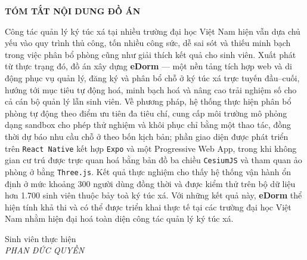 \documentclass[../DoAn.tex]{subfiles}
\begin{document}
\begin{center}
    {\bfseries\fontsize{18pt}{22pt}\selectfont TÓM TẮT NỘI DUNG ĐỒ ÁN}
\end{center}
\vspace{1.5cm}

Công tác quản lý ký túc xá tại nhiều trường đại học Việt Nam hiện vẫn dựa chủ
yếu vào quy trình thủ công, tốn nhiều công sức, dễ sai sót và thiếu minh bạch
trong việc phân bổ phòng cũng như giải thích kết quả cho sinh viên. Xuất phát từ
thực trạng đó, đồ án xây dựng \textbf{eDorm} --- một nền tảng tích hợp web và di
động phục vụ quản lý, đăng ký và phân bổ chỗ ở ký túc xá trực tuyến đầu--cuối,
hướng tới mục tiêu tự động hoá, minh bạch hoá và nâng cao trải nghiệm số cho cả
cán bộ quản lý lẫn sinh viên. Về phương pháp, hệ thống thực hiện phân bổ phòng tự
động theo điểm ưu tiên đa tiêu chí, cung cấp môi trường mô phỏng dạng sandbox cho
phép thử nghiệm và khôi phục chỉ bằng một thao tác, đồng thời dự báo nhu cầu chỗ
ở theo bốn kịch bản; phần giao diện được phát triển trên \texttt{React Native}
kết hợp \texttt{Expo} và một Progressive Web App, trong khi không gian cư trú
được trực quan hoá bằng bản đồ ba chiều \texttt{CesiumJS} và tham quan ảo phòng ở
bằng \texttt{Three.js}. Kết quả thực nghiệm cho thấy hệ thống vận hành ổn định ở
mức khoảng 300 người dùng đồng thời và được kiểm thử trên bộ dữ liệu hơn 1.700
sinh viên thuộc bảy toà ký túc xá. Với những kết quả này, \textbf{eDorm} thể hiện
tính khả thi và có thể được triển khai thực tế tại các trường đại học Việt Nam
nhằm hiện đại hoá toàn diện công tác quản lý ký túc xá.

\vspace{2cm}
\begin{flushright}
    Sinh viên thực hiện\\[4pt]
    {\itshape PHAN ĐỨC QUYỀN}
\end{flushright}
\end{document}
